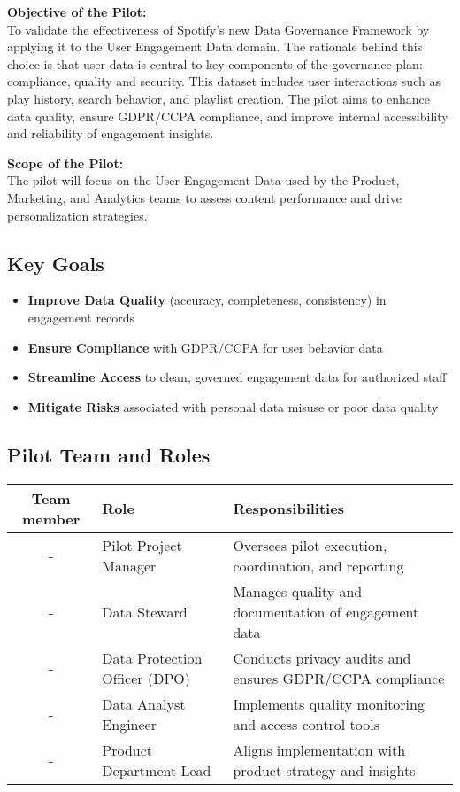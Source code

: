 \documentclass[11pt,a4paper,computermodern]{article}
\begin{document}
\textbf{Objective of the Pilot:}\\
To validate the effectiveness of Spotify’s new Data Governance Framework by applying it to the User Engagement Data domain. The rationale behind this choice is that user data is central to key components of the governance plan: compliance, quality and security. This dataset includes user interactions such as play history, search behavior, and playlist creation. The pilot aims to enhance data quality, ensure GDPR/CCPA compliance, and improve internal accessibility and reliability of engagement insights.

\textbf{Scope of the Pilot:}\\
The pilot will focus on the User Engagement Data used by the Product, Marketing, and Analytics teams to assess content performance and drive personalization strategies.


\subsection*{Key Goals}

\begin{itemize}[itemsep=5pt, parsep=0pt]
	\item \textbf{Improve Data Quality} (accuracy, completeness, consistency) in engagement records
	\item \textbf{Ensure Compliance} with GDPR/CCPA for user behavior data
	\item \textbf{Streamline Access} to clean, governed engagement data for authorized staff
	\item \textbf{Mitigate Risks} associated with personal data misuse or poor data quality
\end{itemize}


\subsection*{Pilot Team and Roles}

\begin{table}[ht]
	\centering
	\begin{threeparttable}
		\label{table:roles}
		\begin{tabularx}{0.99\textwidth}{c >{\centering\arraybackslash}X >{\centering\arraybackslash}X}
			\toprule
			Team member & Role & Responsibilities \\
			\midrule
			- & Pilot Project Manager & Oversees pilot execution, coordination, and reporting \\
			- & Data Steward & Manages quality and documentation of engagement data \\
			- & Data Protection Officer (DPO) & Conducts privacy audits and ensures GDPR/CCPA compliance \\
			- & Data Analyst Engineer & Implements quality monitoring and access control tools \\
			- & Product Department Lead & Aligns implementation with product strategy and insights \\
			\bottomrule
		\end{tabularx}
	\end{threeparttable}
\end{table}
\end{document}
